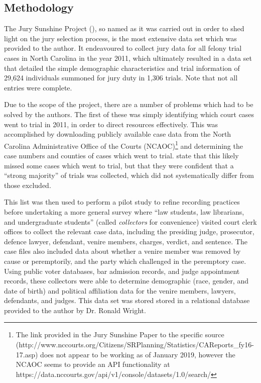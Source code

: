 \subsection{Methodology}

The Jury Sunshine Project (\cite{JurySunshineProject}), so named as it was carried out in order to shed light on the jury
selection process, is the most extensive data set which was provided to the author. It endeavoured to collect jury data for all
felony trial cases in North Carolina in the year 2011, which ultimately resulted in a data set that detailed the simple
demographic characteristics and trial information of 29,624 individuals summoned for jury duty in 1,306 trials. Note that not all
entries were complete.

Due to the scope of the project, there are a number of problems which had to be solved by the authors. The first of these was
simply identifying which court cases went to trial in 2011, in order to direct resources effectively. This was accomplished by
downloading publicly available case data from the North Carolina Administrative Office of the Courts (NCAOC)\footnote{The link provided in
  the Jury Sunshine Paper to the specific source (http://www.nccourts.org/Citizens/SRPlanning/Statistics/CAReports\_fy16-17.asp)
  does not appear to be working as of January 2019, however the NCAOC seems to provide an API functionality at
  https://data.nccourts.gov/api/v1/console/datasets/1.0/search/} and determining the case numbers and counties of cases which went
to trial. \citeauthor{JurySunshineProject} state that this likely missed some cases which went to trial, but that they were
confident that a ``strong majority'' of trials was collected, which did not systematically differ from those excluded.

This list was then used to perform a pilot study to refine recording practices before undertaking a more general survey where
``law students, law librarians, and undergraduate students'' (called \textit{collectors} for convenience) visited court clerk
offices to collect the relevant case data, including the presiding judge, prosecutor, defence lawyer, defendant, venire members,
charges, verdict, and sentence. The case files also included data about whether a venire member was removed by cause or
peremptorily, and the party which challenged in the peremptory case. Using public voter databases, bar admission records, and
judge appointment records, these collectors were able to determine demographic (race, gender, and date of birth) and political
affiliation data for the venire members, lawyers, defendants, and judges. This data set was stored stored in a relational database
provided to the author by Dr. Ronald Wright.

